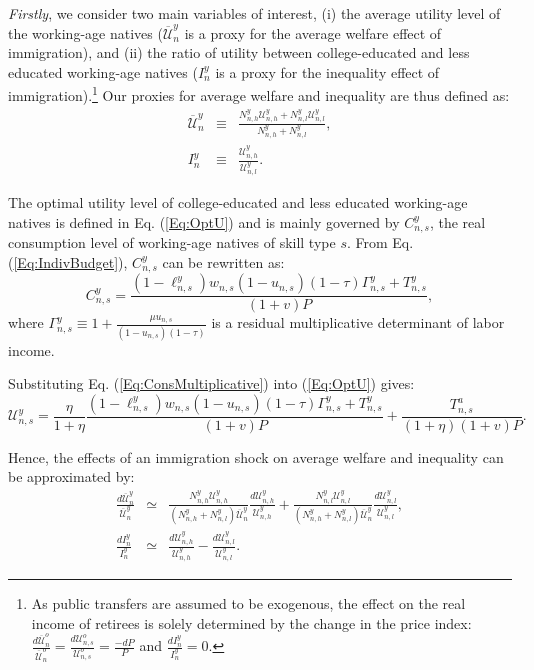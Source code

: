 \documentclass[a4paper,12pt]{article}
\begin{document}
\emph{Firstly}, we consider two main variables of interest, (i) the average utility level of the working-age natives ($\overline{\mathcal{U}}_{n}^{y}$ is a proxy for the average welfare effect of immigration), and (ii) the ratio of utility between college-educated and less educated working-age natives ($I_{n}^{y}$ is a proxy for the inequality effect of immigration).\footnote{As public transfers are assumed to be exogenous, the effect on the real income of retirees is solely determined by the change in the price index: $\frac{d\overline{\mathcal{U}}_{n}^{o}}{\overline{\mathcal{U}}_{n}^{o}}=\frac{d\mathcal{U}_{n,s}^{o}}{\mathcal{U}_{n,s}^{o}}=\frac{-dP}{P}$ and $\frac{dI_{n}^{y}}{I_{n}^{y}}=0$.} Our proxies for average welfare and inequality are thus defined as:
\begin{eqnarray*}
\overline{\mathcal{U}}_{n}^{y} &\equiv &\frac{N_{n,h}^{y}\mathcal{U}_{n,h}^{y}+N_{n,l}^{y}\mathcal{U}_{n,l}^{y}}{N_{n,h}^{y}+N_{n,l}^{y}}, \\
I_{n}^{y} &\equiv & \frac{\mathcal{U}_{n,h}^{y}}{\mathcal{U}_{n,l}^{y}}.
\end{eqnarray*}

The optimal utility level of college-educated and less educated working-age natives is defined in Eq. (\ref{Eq:OptU}) and is mainly governed by $C_{n,s}^{y}$, the real consumption level of working-age natives of skill type $s$. From Eq. (\ref{Eq:IndivBudget}), $C_{n,s}^{y}$ can be rewritten as:
\begin{equation}
C_{n,s}^{y}=\frac{(1-\ell_{n,s}^{y})w_{n,s}(1-u_{n,s})(1-\tau )\Gamma
_{n,s}^{y}+T_{n,s}^{y}}{(1+v)P},  \label{Eq:ConsMultiplicative}
\end{equation}
where $\Gamma _{n,s}^{y}\equiv 1+\frac{\mu u_{n,s}}{(1-u_{n,s})(1-\tau )}$ is a residual multiplicative determinant of labor income.

Substituting Eq. (\ref{Eq:ConsMultiplicative}) into (\ref{Eq:OptU}) gives:
\begin{equation}
\mathcal{U}_{n,s}^{y}=\frac{\eta}{1+\eta}\frac{(1-\ell_{n,s}^{y})w_{n,s}(1-u_{n,s})(1-\tau )\Gamma
_{n,s}^{y}+T_{n,s}^{y}}{(1+v)P} + \frac{T_{n,s}^{a}}{(1+\eta )(1+v)P}. \label{Eq:UtilMultiplicative}
\end{equation}

Hence, the effects of an immigration shock on average welfare and inequality can be approximated by:
\begin{eqnarray}
\frac{d\overline{\mathcal{U}}_{n}^{y}}{\overline{\mathcal{U}}_{n}^{y}} &\simeq&  \frac{N_{n,h}^{y}\mathcal{U}_{n,h}^{y}}{\left( N_{n,h}^{y}+N_{n,l}^{y}\right) \overline{\mathcal{U}}_{n}^{y}} \frac{d\mathcal{U}_{n,h}^{y}}{\mathcal{U}_{n,h}^{y}} +\frac{N_{n,l}^{y}\mathcal{U}_{n,l}^{y}}{\left( N_{n,h}^{y}+N_{n,l}^{y}\right) \overline{\mathcal{U}}_{n}^{y}} \frac{d\mathcal{U}_{n,l}^{y}}{\mathcal{U}_{n,l}^{y}},  \label{Eq:WelfareEffect} \\
\frac{dI_{n}^{y}}{I_{n}^{y}} &\simeq &\frac{d\mathcal{U}_{n,h}^{y}}{\mathcal{U}_{n,h}^{y}} -\frac{d\mathcal{U}_{n,l}^{y}}{\mathcal{U}_{n,l}^{y}}.  \label{Eq:InequalityEffect}
\end{eqnarray}
\end{document}
